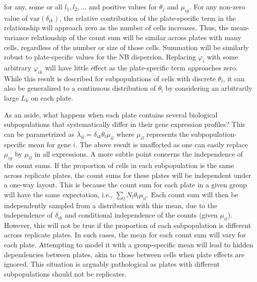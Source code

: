 \documentclass{article}
\begin{document}
for any, some or all $l_1, l_2, \dots$ and positive values for $\theta_j$ and $\mu_{ig}$.
For any non-zero value of $\mbox{var}(\delta_{ik})$, the relative contribution of the plate-specific term in the relationship will approach zero as the number of cells increases.
Thus, the mean-variance relationship of the count sum will be similar across plates with many cells, regardless of the number or size of those cells.
Summation will be similarly robust to plate-specific values for the NB dispersion.
Replacing $\varphi_i$ with some arbitrary $\varphi_{ik}$ will have little effect as the plate-specific term approaches zero.
While this result is described for subpopulations of cells with discrete $\theta_l$, it can also be generalized to a continuous distribution of $\theta_l$ by considering an arbitrarily large $L_k$ on each plate.


As an aside, what happens when each plate contains several biological subpopulations that systematically differ in their gene expression profiles?
This can be parametrized as $\lambda_{il} = \delta_{ik} \theta_l \mu_{il}$ where $\mu_{il}$ represents the subpopulation-specific mean for gene $i$.
The above result is unaffected as one can easily replace $\mu_{ig}$ by $\mu_{il}$ in all expressions.
A more subtle point concerns the independence of the count sums.
If the proportion of cells in each subpopulation is the same across replicate plates, the count sums for these plates will be independent under a one-way layout.
This is because the count sum for each plate in a given group will have the same expectation, i.e., $\sum_l N_l\theta_l \mu_{il}$.
Each count sum will then be independently sampled from a distribution with this mean, due to the independence of $\delta_{ik}$ and conditional independence of the counts (given $\mu_{il}$).
However, this will not be true if the proportion of each subpopulation is different across replicate plates.
In such cases, the mean for each count sum will vary for each plate.
Attempting to model it with a group-specific mean will lead to hidden dependencies between plates, akin to those between cells when plate effects are ignored.
This situation is arguably pathological as plates with different subpopulations should not be replicates.
\end{document}
